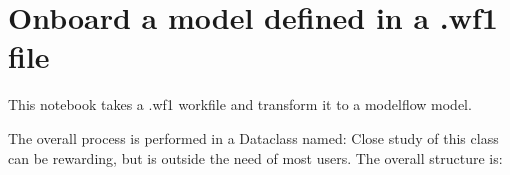 \documentclass[letterpaper,10pt,english]{jupyterBook}
\begin{document}
\sphinxstepscope


\chapter{Onboard a model defined in a .wf1 file}
\label{\detokenize{content/howto/onboard/eviews/onboard one model from  wf1:onboard-a-model-defined-in-a-wf1-file}}\label{\detokenize{content/howto/onboard/eviews/onboard one model from  wf1:onboardone}}\label{\detokenize{content/howto/onboard/eviews/onboard one model from  wf1::doc}}
\sphinxAtStartPar
This notebook takes a .wf1 workfile and transform  it to a modelflow model.

\sphinxAtStartPar
The overall process is performed in a Dataclass named:
Close study of this class can be rewarding, but is outside the need of most users.
The overall structure is:
\end{document}
